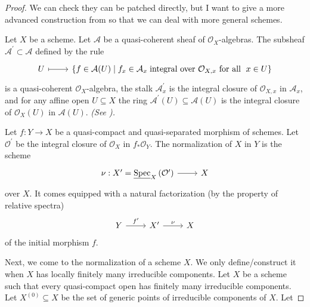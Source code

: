 \begin{proof}
	We can check they can be patched directly,  but I want to give a more advanced construction from \cite{stacks-project} so that we can deal with more general schemes. 
	\begin{lm}
		Let $X$ be a scheme. Let $\mathcal{A}$ be a quasi-coherent sheaf of $\mathcal{O}_{X}$-algebras.  The subsheaf $\mathcal{A}^{\prime} \subset \mathcal{A}$ defined by the rule
		\begin{equation*}
			\begin{tikzcd}
				U \arrow[r, maps to] & \left\{f \in \mathcal{A}(U) \mid f_{x} \in \mathcal{A}_{x}\right.\text{integral over }\mathcal{O}_{X, x}\text{ for all }\left.x \in U\right\}
			\end{tikzcd}
		\end{equation*}
		is a quasi-coherent $\mathcal{O}_{X}$-algebra, the stalk $\mathcal{A}_{x}^{\prime}$ is the integral closure of $\mathcal{O}_{X, x}$ in $\mathcal{A}_{x}$, and for any affine open $U \subseteq X$ the ring $\mathcal{A}^{\prime}(U) \subseteq \mathcal{A}(U)$ is the integral closure of $\mathcal{O}_{X}(U)$ in $\mathcal{A}(U)$.   \emph{(See \cite[\href{https://stacks.math.columbia.edu/tag/035F}{Tag 035F}]{stacks-project}).}
	\end{lm}
	\begin{defn}
		Let $f: Y \rightarrow X$ be a quasi-compact and quasi-separated morphism of schemes. Let $\mathcal{O}^{\prime}$ be the integral closure of $\mathcal{O}_{X}$ in $f_{*} \mathcal{O}_{Y}$. The normalization of $X$ in $Y$ is the scheme
		\begin{equation*}
			\begin{tikzcd}
				\nu: X^{\prime}=\underline{\operatorname{Spec}}_{X}\left(\mathcal{O}^{\prime}\right) \arrow[r] & X
			\end{tikzcd}
		\end{equation*}
		over $X$.  It comes equipped with a natural factorization (by the property of relative spectra)
		\begin{equation*}
			\begin{tikzcd}
				Y \arrow[r, "f'"] & X' \arrow[r, "\nu"] & X
			\end{tikzcd}
		\end{equation*}
		of the initial morphism $f$.
	\end{defn}
	Next, we come to the normalization of a scheme $X .$ We only define/construct it when $X$ has locally finitely many irreducible components. Let $X$ be a scheme such that every quasi-compact open has finitely many irreducible components. Let $X^{(0)} \subseteq X$ be the set of generic points of irreducible components of $X .$ Let

\end{proof}
